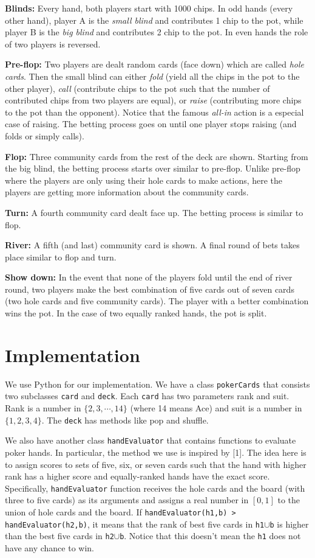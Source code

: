\BIT
\item \textbf{Blinds:} Every hand, both players start with 1000 chips. In odd hands (every other 
hand), player A is the \emph{small blind} and contributes 1 chip to the pot, while 
player B is the \emph{big blind} and contributes 2 chip to the pot. In even hands the 
role of two players is reversed. 
\item \textbf{Pre-flop:} Two players are dealt random cards (face down) which are called
\emph{hole cards}. Then the small blind can either \emph{fold} (\ie yield all the chips in
the pot to the other player), \emph{call} (contribute chips to the pot such that the number
of contributed chips from two players are equal), or \emph{raise} (contributing more chips
to the pot than the opponent). Notice that the famous \emph{all-in} action is a especial case
of raising. The betting process goes on until one player stops raising (and folds or simply calls).
\item \textbf{Flop:} Three community cards from the rest of the deck are shown. Starting from
the big blind, the betting process starts over similar to pre-flop. Unlike pre-flop where the
players are only using their hole cards to make actions, here the players are getting more
information about the community cards.
\item \textbf{Turn:} A fourth community card dealt face up. The betting process is similar to
flop.
\item \textbf{River:} A fifth (and last) community card is shown. A final round of bets takes place
similar to flop and turn.
\item \textbf{Show down:} In the event that none of the players fold until the end of river round,
two players make the best combination of five cards out of seven cards (two hole cards and 
five community cards). The player with a better combination wins the pot. In the case of
two equally ranked hands, the pot is split.
\EIT

\section{Implementation}
We use Python for our implementation. We have a class {\tt pokerCards} that consists
two subclasses {\tt card} and {\tt deck}. Each {\tt card} has two parameters rank and suit.
Rank is a number in $\{2,3,\cdots,14\}$ (where 14 means Ace) and suit is a number in 
$\{1,2,3,4\}$. The {\tt deck} has methods like pop and shuffle.

We also have another class {\tt handEvaluator} that contains functions to evaluate poker hands.
In particular, the method we use is inspired by [1]. The idea here is to assign scores to sets of
five, six, or seven cards such that the hand with higher rank has a higher score and equally-ranked
hands have the exact score. Specifically, {\tt handEvaluator} function receives the hole cards and  
the board (with three to five cards) as its arguments and assigns a real number in $[0,1]$
to the union of hole cards and the board. If {\tt handEvaluator(h1,b) > handEvaluator(h2,b)},
it means that the rank of best five cards in {\tt h1$\cup$b} is higher than the best five cards
in {\tt h2$\cup$b}. Notice that this doesn't mean the {\tt h1} does not have any chance to win.
